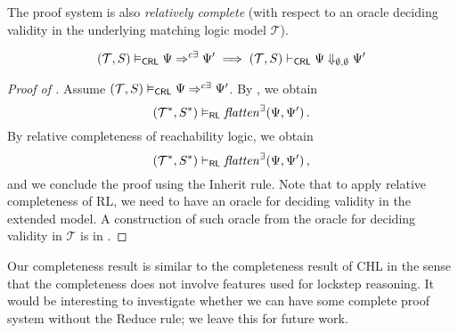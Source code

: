 


The proof system is also \emph{relatively complete} (with respect to an oracle deciding validity
in the underlying matching logic model $\mathcal{T}$).
\begin{theorem}\label{thm:relativeCompleteness}
  \begin{equation*}
      (\mathcal{T}, S) \vDash_{\mathsf{CRL}} \Psi \Rightarrow^{c\exists} \Psi^\prime \implies
      (\mathcal{T}, S) \vdash_{\mathsf{CRL}} \Psi \Downarrow_{\emptyset,\emptyset} \Psi^\prime
  \end{equation*}
  \end{theorem}
  \begin{proof}[Proof of ]
  Assume $(\mathcal{T}, S) \vDash_{\mathsf{CRL}} \Psi \Rightarrow^{c\exists} \Psi^\prime$.
  By , 
  we obtain
  \begin{equation*}
    (\mathcal{T}^*, S^*) \vDash_{\mathsf{RL}}
    \mathit{flatten}^\exists(\Psi, \Psi^\prime) \, .
  \end{equation*}
  By relative completeness of reachability logic, we obtain
  \begin{equation*}
    (\mathcal{T}^*, S^*) \vdash_{\mathsf{RL}}
    \mathit{flatten}^\exists(\Psi, \Psi^\prime) \, ,
  \end{equation*}
  and we conclude the proof using the Inherit rule.
  Note that to apply relative completeness of RL, we need to have an oracle for deciding validity in the extended model.
  A construction of such oracle from the oracle for deciding validity in $\mathcal{T}$ is in .
  \end{proof}
Our completeness result is similar to the completeness result of CHL in the sense that the completeness
does not involve features used for lockstep reasoning.
It would be interesting to investigate whether we can have some complete proof system without the Reduce rule;
we leave this for future work.


